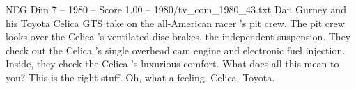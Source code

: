\begin{textsample}{NEG Dim 7 – 1980 – Score 1.00 – 1980/tv\_com\_1980\_43.txt}  \label{ex:f7_neg_053}
Dan Gurney and his Toyota Celica GTS take on the all-American racer 's pit crew.
The pit crew looks over the Celica 's ventilated disc brakes, the independent suspension.
They check out the Celica 's single overhead cam engine and electronic fuel injection.
Inside, they check the Celica 's luxurious comfort.
What does all this mean to you?
This is the right stuff.
Oh, what a feeling.
Celica.
Toyota.

\end{textsample}
